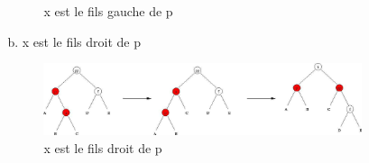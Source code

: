 \begin{itemize}
\begin{enumerate}
\begin{enumerate}
\begin{figure}[H]
	\caption{x est le fils gauche de p}
\end{figure}
					\item[b.] x est le fils droit de p 
\begin{figure}[H]
	\centering
	\includegraphics[width=12.5cm]{content/schemas/arbreRNcas2b.png}
	\caption{x est le fils droit de p}
\end{figure}
				\end{enumerate}
		\end{enumerate}
\end{itemize}

